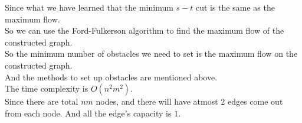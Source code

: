 Since what we have learned that the minimum $s-t$ cut is the same as the maximum flow.\\
So we can use the Ford-Fulkerson algorithm to find the maximum flow of the constructed graph. \\

So the minimum number of obstacles we need to set is the maximum flow on the constructed graph. \\
And the methods to set up obstacles are mentioned above.\\
The time complexity is $O(n^2m^2)$.\\
Since there are total $nm$ nodes, and there will have atmost $2$ edges come out from each node. And all the edge's capacity is $1$.\\

\newpage